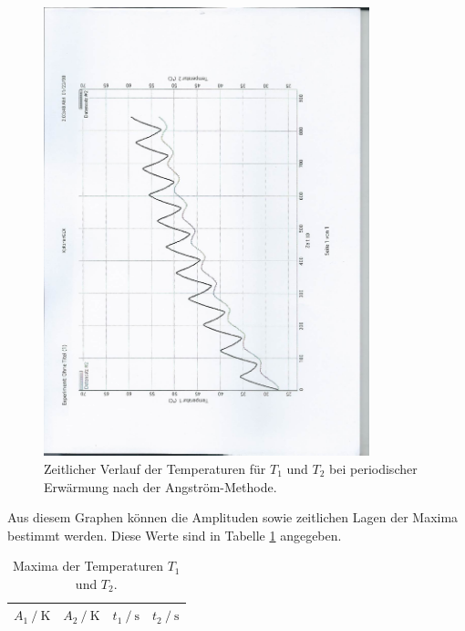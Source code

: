 \begin{figure}
  \centering
  \includegraphics[height=13cm, angle=270]{scan-3.jpg}
  \caption{Zeitlicher Verlauf der Temperaturen für $T_1$ und $T_2$ bei periodischer Erwärmung nach der Angström-Methode.}
  \label{fig:5}
\end{figure}

Aus diesem Graphen können die Amplituden sowie zeitlichen Lagen der Maxima bestimmt werden.
Diese Werte sind in Tabelle \ref{tab:3} angegeben.

\begin{table}
  \centering
  \caption{Maxima der Temperaturen $T_1$ und $T_2$.}
  \label{tab:3}
  \begin{tabular}{c c c c}
    \toprule
    {$A_1 \:/\: \si{\kelvin}$} & {$A_2 \:/\: \si{\kelvin}$}  & {$t_1 \:/\: \si{\second}$}  & {$t_2 \:/\: \si{\second}$}\\
    \midrule
    
    \bottomrule
  \end{tabular}
\end{table}


%    
%
